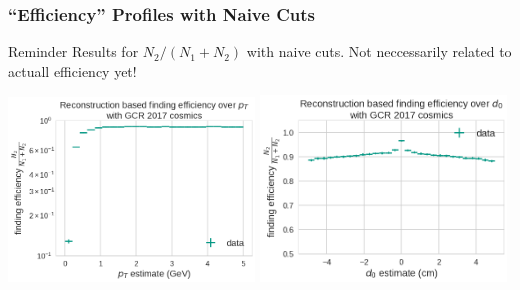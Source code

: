 \documentclass[18pt]{beamer}
\begin{document}
  \begin{frame}
    \frametitle{``Efficiency'' Profiles with Naive Cuts}
    \begin{alertblock}{Reminder}
      Results for $N_2 / (N_1 + N_2)$ with naive cuts. Not neccessarily related to actuall efficiency yet!
    \end{alertblock}
    \begin{center}
      \includegraphics[width=0.49\textwidth]{figures/findeff_pt_data.png}
      \includegraphics[width=0.49\textwidth]{figures/findeff_d0_data.png}
    \end{center}
  \end{frame}
\end{document}
